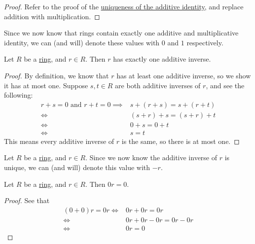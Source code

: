 \documentclass{scrartcl}
\begin{document}
\begin{proof}
    Refer to the proof of the \hyperref[prop:unique additive identity]{uniqueness of the additive identity}, and
    replace addition with multiplication.
\end{proof}

\begin{remark}
    Since we now know that rings contain exactly one additive and multiplicative identity, we can (and will) denote
    these values with $0$ and $1$ respectively.
\end{remark}

\begin{proposition}
    \label{prop:unique additive inverse}
    Let $R$ be a \hyperref[def:ring]{ring}, and $r\in R$.
    Then $r$ has exactly one additive inverse.
\end{proposition}

\begin{proof}
    By definition, we know that $r$ has at least one additive inverse, so we show it has at most one.
    Suppose $s,t\in R$ are both additive inverses of $r$, and see the following:
    \begin{align}
        r+s=0\text{ and }r+t=0
        \implies& s+(r+s)=s+(r+t) \\
        \iff& (s+r)+s=(s+r)+t \\
        \iff& 0+s=0+t \\
        \iff& s=t
    \end{align}
    This means every additive inverse of $r$ is the same, so there is at most one.
\end{proof}

\begin{remark}
    Let $R$ be a \hyperref[def:ring]{ring}, and $r\in R$.
    Since we now know the additive inverse of $r$ is unique, we can (and will) denote this value with $-r$.
\end{remark}

\begin{proposition}
    \label{prop:multiply by zero}
    Let $R$ be a \hyperref[def:ring]{ring}, and $r\in R$.
    Then $0r=0$.
\end{proposition}

\begin{proof}
    See that
    \begin{align}
        (0+0)r=0r
        \iff& 0r+0r=0r \\
        \iff& 0r+0r-0r=0r-0r \\
        \iff& 0r=0
    \end{align}
\end{proof}
\end{document}
